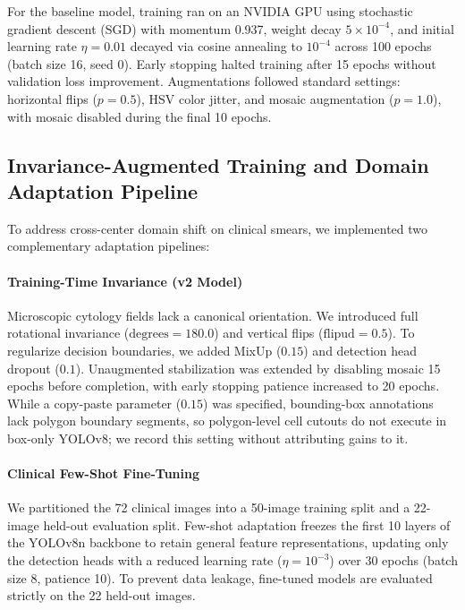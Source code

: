 \documentclass[10pt,conference]{IEEEtran}
\begin{document}
For the baseline model, training ran on an NVIDIA GPU using stochastic gradient descent (SGD) with momentum 0.937, weight decay $5 \times 10^{-4}$, and initial learning rate $\eta = 0.01$ decayed via cosine annealing to $10^{-4}$ across 100 epochs (batch size 16, seed 0). Early stopping halted training after 15 epochs without validation loss improvement. Augmentations followed standard settings: horizontal flips ($p=0.5$), HSV color jitter, and mosaic augmentation ($p=1.0$), with mosaic disabled during the final 10 epochs.

\subsection{Invariance-Augmented Training and Domain Adaptation Pipeline}
\label{sec:generalization_pipeline}
To address cross-center domain shift on clinical smears, we implemented two complementary adaptation pipelines:

\paragraph{Training-Time Invariance (v2 Model)}
Microscopic cytology fields lack a canonical orientation. We introduced full rotational invariance ($\text{degrees} = 180.0$) and vertical flips ($\text{flipud} = 0.5$). To regularize decision boundaries, we added MixUp ($0.15$) and detection head dropout ($0.1$). Unaugmented stabilization was extended by disabling mosaic 15 epochs before completion, with early stopping patience increased to 20 epochs. While a copy-paste parameter ($0.15$) was specified, bounding-box annotations lack polygon boundary segments, so polygon-level cell cutouts do not execute in box-only YOLOv8; we record this setting without attributing gains to it.

\paragraph{Clinical Few-Shot Fine-Tuning}
We partitioned the 72 clinical images into a 50-image training split and a 22-image held-out evaluation split. Few-shot adaptation freezes the first 10 layers of the YOLOv8n backbone to retain general feature representations, updating only the detection heads with a reduced learning rate ($\eta = 10^{-3}$) over 30 epochs (batch size 8, patience 10). To prevent data leakage, fine-tuned models are evaluated strictly on the 22 held-out images.
\end{document}
